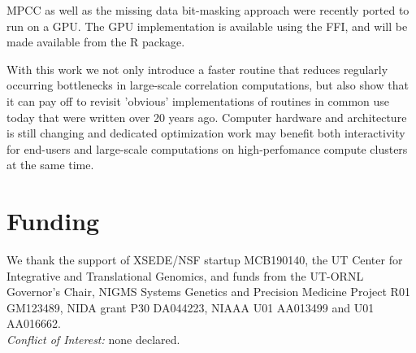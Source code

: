 \documentclass{bioinfo}
\begin{document}
MPCC as well as the missing data bit-masking approach were recently
ported to run on a GPU. The GPU implementation is available using the
FFI, and will be made available from the R package.

With this work we not only introduce a faster routine that reduces
regularly occurring bottlenecks in large-scale correlation computations, but
also show that it can pay off to revisit 'obvious' implementations
of routines in common use today that were written over 20 years
ago. Computer hardware and architecture is still changing and
dedicated optimization work may benefit both interactivity for
end-users and large-scale computations on high-perfomance compute
clusters at the same time.

\section*{Funding}

We thank the support of XSEDE/NSF startup MCB190140, the UT Center for
Integrative and Translational Genomics, and funds from the UT-ORNL
Governor's Chair, NIGMS Systems Genetics and Precision Medicine
Project R01 GM123489, NIDA grant P30 DA044223, NIAAA U01 AA013499 and
U01 AA016662.\\
\textit{Conflict of Interest:} none declared.

\vspace*{-5mm}


\end{document}
